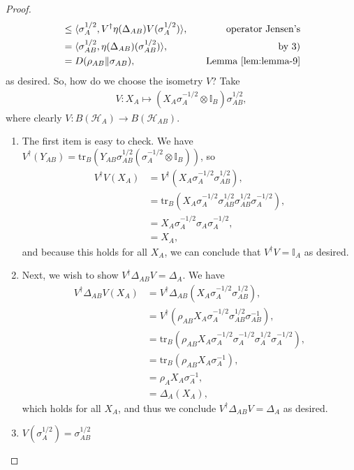 \documentclass[notoc]{tufte-book}
\begin{document}
\begin{proof}
\begin{align}
    &\leq \langle \sigma_A^{1/2},V^{\dagger} \eta(\Delta_{AB})V(\sigma_A^{1/2})\rangle, \quad & \text{operator Jensen's}\\
    &= \langle \sigma_{AB}^{1/2}, \eta(\Delta_{AB})(\sigma_{AB}^{1/2})\rangle, \quad & \text{by 3)}\\
    &=D(\rho_{AB}\| \sigma_{AB}),\quad & \text{Lemma \ref{lem:lemma-9}}
\end{align}
as desired. So, how do we choose the isometry $V$? Take 
\begin{align}
    V: X_A \mapsto (X_A \sigma_{A}^{-1/2}\otimes \mathbb{I}_B) \sigma_{AB}^{1/2},
\end{align}
where clearly $V: B(\mathcal{H}_A)\rightarrow B(\mathcal{H}_{AB})$.

\begin{enumerate}
    \item The first item is easy to check. We have $V^{\dagger} (Y_{AB}) = \text{tr}_B (Y_{AB} \sigma_{AB}^{1/2}(\sigma_A^{-1/2}\otimes \mathbb{I}_B))$, so 
    \begin{align}
        V^{\dagger}V (X_A) &= V^{\dagger} (X_A \sigma_A^{-1/2} \sigma_{AB}^{1/2}),\\
        &= \text{tr}_B(X_A \sigma_A^{-1/2} \sigma_{AB}^{1/2} \sigma_{AB}^{1/2} \sigma_A^{-1/2}), \\
        &= X_A \sigma_A^{-1/2} \sigma_A \sigma_A^{-1/2},\\
        &=X_A,
    \end{align}
    and because this holds for all $X_A$, we can conclude that $V^{\dagger} V =\mathbb{I}_A$ as desired.
    \item Next, we wish to show $V^{\dagger} \Delta_{AB} V = \Delta_A$. We have
    \begin{align}
        V^{\dagger} \Delta_{AB} V (X_A) &= V^{\dagger} \Delta_{AB} (X_A \sigma_A^{-1/2} \sigma_{AB}^{1/2}),\\
        &= V^{\dagger} (\rho_{AB} X_A \sigma_A^{-1/2} \sigma_{AB}^{1/2}\sigma_{AB}^{-1}),\\
        &=\text{tr}_B(\rho_{AB} X_A \sigma_A^{-1/2}\sigma_A^{-1/2}\sigma_A^{1/2}\sigma_A^{-1/2}),\\
        &= \text{tr}_B(\rho_{AB} X_A \sigma_A^{-1}),\\
        &= \rho_A X_A \sigma_A^{-1},\\
        &= \Delta_A (X_A),
    \end{align}
    which holds for all $X_A$, and thus we conclude  $V^{\dagger} \Delta_{AB} V = \Delta_A$ as desired. 
    
    \item $V(\sigma_A^{1/2})=\sigma_{AB}^{1/2}$
\end{enumerate}
\end{proof}
\end{document}
